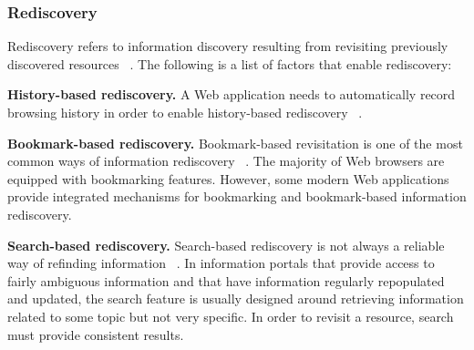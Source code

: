\documentclass{casconpaper}
\begin{document}
{\subsubsection{Rediscovery}
Rediscovery refers to information discovery resulting from revisiting previously discovered resources ~\cite{tauscher}. The following is a list of factors that enable rediscovery:

\textbf{History-based rediscovery.} A Web application needs to automatically record browsing history in order to enable history-based rediscovery ~\cite{tauscher}.   

\textbf{Bookmark-based rediscovery.} Bookmark-based revisitation is one of the most common ways of information rediscovery ~\cite{abrams}. The majority of Web browsers are equipped with bookmarking features. However, some modern Web applications provide integrated mechanisms for bookmarking and bookmark-based information rediscovery.

\textbf{Search-based rediscovery.} Search-based rediscovery is not always a reliable way of refinding information ~\cite{cockburn}. In information portals that provide access to fairly ambiguous information and that have information regularly repopulated and updated, the search feature is usually designed around retrieving information related to some topic but not very specific. In order to revisit a resource, search must provide consistent results.

} %
\end{document}
